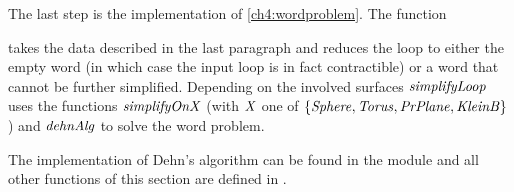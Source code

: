 The last step is the implementation of \cref{ch4:wordproblem}. The function\begin{hscode}\SaveRestoreHook
{}%
%
%
\>[3]{}\mathbin{::}\;\to {}\to {}\<[E]%
\ColumnHook
\end{hscode}\resethooks
takes the data described in the last paragraph and reduces the loop to either
the empty word (in which case the input loop is in fact contractible) or a
word that cannot be further simplified. Depending on the involved surfaces
\ensuremath{\Varid{simplifyLoop}} uses the functions \ensuremath{\Varid{simplifyOnX}} (with \ensuremath{\Conid{X}} one of
$\{\text{\ensuremath{\mathit{Sphere}}}, \text{\ensuremath{\mathit{Torus}}}, \text{\ensuremath{\mathit{PrPlane}}}, \text{\ensuremath{\mathit{KleinB}}}\}$)
and \ensuremath{\Varid{dehnAlg}} to solve the word problem.

The implementation of Dehn's algorithm can be found in the module
 and all other functions of this section are defined
in .
